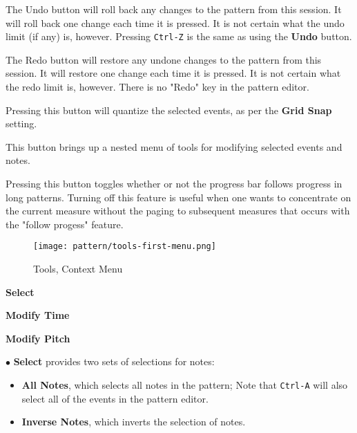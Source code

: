    \setcounter{ItemCounter}{0}      %

   The Undo button will roll back any changes to the pattern from this
   session.
   It will roll back one change each time it is pressed.
   It is not certain what the undo limit (if any) is, however.
   Pressing \texttt{Ctrl-Z} is the same as using the \textbf{Undo} button.

   The Redo button will restore any undone changes to the pattern from this
   session.
   It will restore one change each time it is pressed.
   It is not certain what the redo limit is, however.
   There is no "Redo" key in the pattern editor.

   Pressing this button will quantize the selected events, as per
   the \textbf{Grid Snap} setting.

   This button brings up a nested menu of tools for modifying selected
   events and notes.

   Pressing this button toggles whether or not the progress bar follows
   progress in long patterns.  Turning off this feature is useful when
   one wants to concentrate on the current measure without the paging to
   subsequent measures that occurs with the "follow progess" feature.

\begin{figure}[H]
   \centering 
   \texttt{[image: pattern/tools-first-menu.png]}
   \caption{Tools, Context Menu}
   \label{fig:pattern_editor_tools_first_menu}
\end{figure}

   \begin{enumber}
      \item \textbf{Select}
      \item \textbf{Modify Time}
      \item \textbf{Modify Pitch}
   \end{enumber}

   $\bullet$ \textbf{Select} provides two sets of selections for notes:
   \begin{itemize}
      \item \textbf{All Notes}, which selects all notes in the pattern;
         Note that  \texttt{Ctrl-A} will also select
         all of the events in the pattern editor.
      \item \textbf{Inverse Notes}, which inverts the selection of notes.
   \end{itemize}

